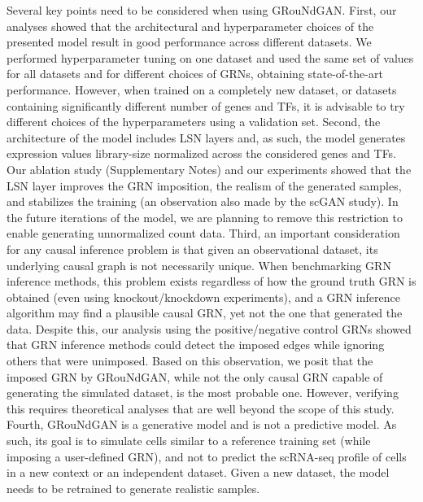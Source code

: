 Several key points need to be considered when using GRouNdGAN. First, our analyses showed that the architectural and hyperparameter choices of the presented model result in good performance across different datasets. We performed hyperparameter tuning on one dataset and used the same set of values for all datasets and for different choices of GRNs, obtaining state-of-the-art performance. However, when trained on a completely new dataset, or datasets containing significantly different number of genes and TFs, it is advisable to try different choices of the hyperparameters using a validation set. Second, the architecture of the model includes LSN layers and, as such, the model generates expression values library-size normalized across the considered genes and TFs. Our ablation study (Supplementary Notes) and our experiments showed that the LSN layer improves the GRN imposition, the realism of the generated samples, and stabilizes the training (an observation also made by the scGAN study). In the future iterations of the model, we are planning to remove this restriction to enable generating unnormalized count data. Third, an important consideration for any causal inference problem is that given an observational dataset, its underlying causal graph is not necessarily unique. When benchmarking GRN inference methods, this problem exists regardless of how the ground truth GRN is obtained (even using knockout/knockdown experiments), and a GRN inference algorithm may find a plausible causal GRN, yet not the one that generated the data. Despite this, our analysis using the positive/negative control GRNs showed that GRN inference methods could detect the imposed edges while ignoring others that were unimposed. Based on this observation, we posit that the imposed GRN by GRouNdGAN, while not the only causal GRN capable of generating the simulated dataset, is the most probable one. However, verifying this requires theoretical analyses that are well beyond the scope of this study. Fourth, GRouNdGAN is a generative model and is not a predictive model. As such, its goal is to simulate cells similar to a reference training set (while imposing a user-defined GRN), and not to predict the scRNA-seq profile of cells in a new context or an independent dataset. Given a new dataset, the model needs to be retrained to generate realistic samples.

